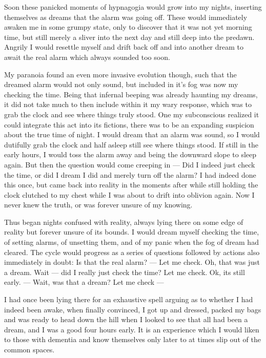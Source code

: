 \documentclass[ebook, 10pt, openright, onecolumn]{memoir}
\begin{document}
Soon these panicked moments of hypnagogia would grow into my nights, inserting
themselves as dreams that the alarm was going off.  These would immediately
awaken me in some grumpy state, only to discover that it was not yet morning
time, but still merely a sliver into the next day and still deep into the
predawn.  Angrily I would resettle myself and drift back off and into another
dream to await the real alarm which always sounded too soon.

My paranoia found an even more invasive evolution though, such that the dreamed
alarm would not only sound, but included in it's fog was now my checking the
time.  Being that infernal beeping was already haunting my dreams, it did not
take much to then include within it my wary response, which was to grab the
clock and see where things truly stood.  One my subconscious realized it could
integrate this act into its fictions, there was to be an expanding suspicion
about the true time of night.  I would dream that an alarm was sound, so I would
dutifully grab the clock and half asleep still see where things stood.  If still
in the early hours, I would toss the alarm away and being the downward slope to
sleep again.  But then the question would come creeping in --- Did I indeed just
check the time, or did I dream I did and merely turn off the alarm?  I had
indeed done this once, but came back into reality in the moments after while
still holding the clock clutched to my chest while I was about to drift into
oblivion again.  Now I never knew the truth, or was forever unsure of my
knowing.

Thus began nights confused with reality, always lying there on some edge of
reality but forever unsure of its bounds.  I would dream myself checking the
time, of setting alarms, of unsetting them, and of my panic when the fog of
dream had cleared.  The cycle would progress as a series of questions followed
by actions also immediately in doubt:  Is that the real alarm? --- Let me
check. Oh, that was just a dream.  Wait --- did I really just check the time?
Let me check.  Ok, its still early. --- Wait, was that a dream?  Let me check
---

I had once been lying there for an exhaustive spell arguing as to whether I had
indeed been awake, when finally convinced, I got up and dressed, packed my bags
and was ready to head down the hill when I looked to see that all had been a
dream, and I was a good four hours early.  It is an experience which I would
liken to those with dementia and know themselves only later to at times slip out
of the common spaces.
\end{document}
